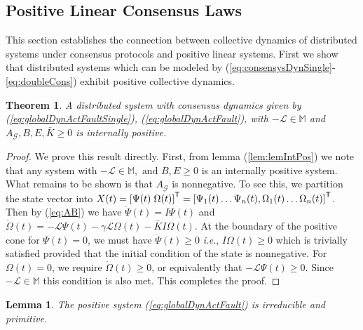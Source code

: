 \documentclass[letterpaper, 10 pt, conference]{ieeeconf}  %
\newtheorem{theorem}{Theorem}
\newtheorem{lemma}{Lemma}
\def\tT{\mathsf{T}} %
\def\mM{\mathbb{M}}
\def\cG{\mathcal{G}}
\def\cL{\mathcal{L}}
\newcommand{\ie}{\textit{i}.\textit{e}., }
\begin{document}
\subsection{Positive Linear Consensus Laws}
This section establishes the connection between collective dynamics of distributed systems under consensus protocols and positive linear systems. First we show that distributed systems which can be modeled by (\ref{eq:consensysDynSingle}-\ref{eq:doubleCons}) exhibit positive collective dynamics.  
\begin{theorem} \label{thrm:2}
A distributed system with consensus dynamics given by (\ref{eq:globalDynActFaultSingle}),  (\ref{eq:globalDynActFault}), with $-\cL \in \mM$ and $A_{\cG}, B, E,\bar{K} \geq 0$ is internally positive. 
\end{theorem}
\begin{proof}
We prove this result directly. First, from lemma (\ref{lem:lemIntPos}) we note that any system with $-\cL \in \mM,\text{ and } B, E \geq 0$ is an internally positive system. What remains to be shown is that $A_{\cG}$ is nonnegative. To see this, we partition the state vector into $X(t) = \left[\Psi(t) \hspace{1mm} \Omega(t)\right]^{\tT} = \left[\Psi_1(t) \ldots \Psi_n(t), \Omega_1(t) \ldots \Omega_n(t)\right]^{\tT}$. Then by (\ref{eq:AB}) we have 
$\dot{\Psi}(t) = I \Psi(t)$ and $\dot{\Omega}(t) = -\cL \Psi(t) - \gamma \cL \Omega(t) - \bar{K} I \Omega(t)$.
At the boundary of the positive cone for $\Psi(t) = 0$, we must have $\dot{\Psi}(t) \geq 0$ \ie $I \Omega(t) \geq 0$ which is trivially satisfied provided that the initial condition of the state is nonnegative.  For $\Omega(t) = 0$, we require $\dot{\Omega}(t) \geq 0$, or equivalently that $-\cL \Psi(t) \geq 0$. Since $-\cL \in \mM$ this condition is also met. This completes the proof. 
\end{proof}
\begin{lemma} \label{lem:irreducibleDist}
The positive system (\ref{eq:globalDynActFault}) is irreducible and primitive.
\end{lemma}
\end{document}
